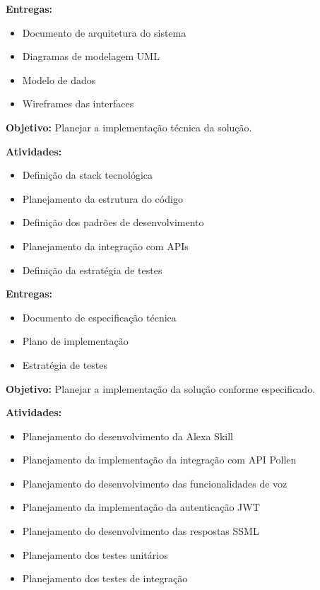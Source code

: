 \textbf{Entregas:}
\begin{itemize}
    \item Documento de arquitetura do sistema
    \item Diagramas de modelagem UML
    \item Modelo de dados
    \item Wireframes das interfaces
\end{itemize}


\textbf{Objetivo:} Planejar a implementação técnica da solução.

\textbf{Atividades:}
\begin{itemize}
    \item Definição da stack tecnológica
    \item Planejamento da estrutura do código
    \item Definição dos padrões de desenvolvimento
    \item Planejamento da integração com APIs
    \item Definição da estratégia de testes
\end{itemize}

\textbf{Entregas:}
\begin{itemize}
    \item Documento de especificação técnica
    \item Plano de implementação
    \item Estratégia de testes
\end{itemize}


\textbf{Objetivo:} Planejar a implementação da solução conforme especificado.

\textbf{Atividades:}
\begin{itemize}
    \item Planejamento do desenvolvimento da Alexa Skill
    \item Planejamento da implementação da integração com API Pollen
    \item Planejamento do desenvolvimento das funcionalidades de voz
    \item Planejamento da implementação da autenticação JWT
    \item Planejamento do desenvolvimento das respostas SSML
    \item Planejamento dos testes unitários
    \item Planejamento dos testes de integração
\end{itemize}

